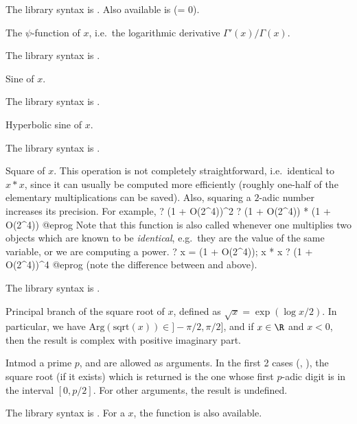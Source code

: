 The library syntax is .
Also available is
 (\fl = 0).

\label{se:psi}
The $\psi$-function of $x$, i.e.~the logarithmic derivative
$\Gamma'(x)/\Gamma(x)$.

The library syntax is .

\label{se:sin}
Sine of $x$.

The library syntax is .

\label{se:sinh}
Hyperbolic sine of $x$.

The library syntax is .

\label{se:sqr}
Square of $x$. This operation is not completely
straightforward, i.e.~identical to $x * x$, since it can usually be
computed more efficiently (roughly one-half of the elementary
multiplications can be saved). Also, squaring a $2$-adic number increases
its precision. For example,
\bprog
? (1 + O(2^4))^2
? (1 + O(2^4)) * (1 + O(2^4))
@eprog\noindent
Note that this function is also called whenever one multiplies two objects
which are known to be \emph{identical}, e.g.~they are the value of the same
variable, or we are computing a power.
\bprog
? x = (1 + O(2^4)); x * x
? (1 + O(2^4))^4
@eprog\noindent
(note the difference between  and  above).

The library syntax is .

\label{se:sqrt}
Principal branch of the square root of $x$, defined as $\sqrt{x} =
\exp(\log x / 2)$. In particular, we have
$\text{Arg}(\text{sqrt}(x))\in{} ]-\pi/2, \pi/2]$, and if $x\in \R$ and $x<0$,
then the result is complex with positive imaginary part.

Intmod a prime $p$,  and  are allowed as arguments. In
the first 2 cases (, ), the square root (if it
exists) which is returned is the one whose first $p$-adic digit is in the
interval $[0,p/2]$. For other arguments, the result is undefined.

The library syntax is .
For a  $x$, the function
 is also available.

